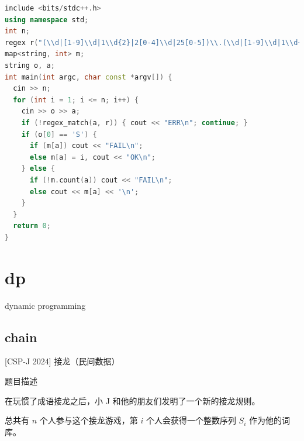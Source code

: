 \documentclass[12pt,twiside,a4paper]{ctexbook}
\numberwithin{chapter}{part}
\begin{document}
\begin{lstlisting}[language=c++,breaklines=true]
include <bits/stdc++.h>
using namespace std;
int n;
regex r("(\\d|[1-9]\\d|1\\d{2}|2[0-4]\\d|25[0-5])\\.(\\d|[1-9]\\d|1\\d{2}|2[0-4]\\d|25[0-5])\\.(\\d|[1-9]\\d|1\\d{2}|2[0-4]\\d|25[0-5])\\.(\\d|[1-9]\\d|1\\d{2}|2[0-4]\\d|25[0-5]):(\\d|[1-9]\\d{1,3}|[1-5]\\d{4}|6[0-4]\\d{3}|65[0-4]\\d{2}|655[0-2]\\d|6553[0-5])");
map<string, int> m;
string o, a;
int main(int argc, char const *argv[]) {
  cin >> n;
  for (int i = 1; i <= n; i++) {
    cin >> o >> a;
    if (!regex_match(a, r)) { cout << "ERR\n"; continue; }
    if (o[0] == 'S') {
      if (m[a]) cout << "FAIL\n";
      else m[a] = i, cout << "OK\n";
    } else {
      if (!m.count(a)) cout << "FAIL\n";
      else cout << m[a] << '\n';
    }
  }
  return 0;
}
\end{lstlisting}

\chapter{dp}
dynamic programming
\section{chain}
 [CSP-J 2024] 接龙（民间数据）

 题目描述

在玩惯了成语接龙之后，小 J 和他的朋友们发明了一个新的接龙规则。

总共有 $n$ 个人参与这个接龙游戏，第 $i$ 个人会获得一个整数序列 $S_i$ 作为他的词库。
\end{document}

